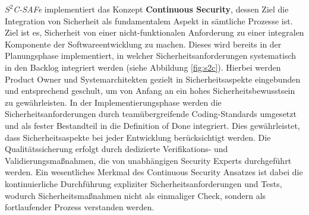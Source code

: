 \documentclass[acmtog]{acmart}
\begin{document}
\textit{$S^2$C-SAFe} implementiert das Konzept \textbf{Continuous Security}, dessen Ziel die Integration von Sicherheit als fundamentalem Aspekt in sämtliche Prozesse ist. 
Ziel ist es, Sicherheit von einer nicht-funktionalen Anforderung zu einer integralen Komponente der Softwareentwicklung zu machen.
Dieses wird bereits in der Planungsphase implementiert, in welcher Sicherheitsanforderungen systematisch in den Backlog integriert werden (siehe Abbildung \ref{fig:s2c}). \cite{moyon_how_2020} 
Hierbei werden Product Owner und Systemarchitekten gezielt in Sicherheitsaspekte eingebunden und entsprechend geschult, um von Anfang an ein hohes Sicherheitsbewusstsein zu gewährleisten. 
In der Implementierungsphase werden die Sicherheitsanforderungen durch teamübergreifende Coding-Standards umgesetzt und als fester Bestandteil in die Definition of Done integriert. 
Dies gewährleistet, dass Sicherheitsaspekte bei jeder Entwicklung berücksichtigt werden. \cite{moyon_how_2020}
Die Qualitätssicherung erfolgt durch dedizierte Verifikations- und Validierungsmaßnahmen, die von unabhängigen Security Experts durchgeführt werden. 
Ein wesentliches Merkmal des Continuous Security Ansatzes ist dabei die kontinuierliche Durchführung expliziter Sicherheitsanforderungen und Tests, wodurch Sicherheitsmaßnahmen nicht als einmaliger Check, 
sondern als fortlaufender Prozess verstanden werden. \cite{moyon_how_2020}
\end{document}

